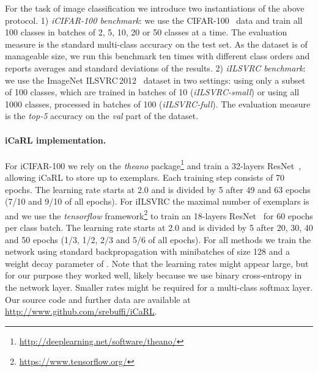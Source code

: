 \documentclass[10pt,twocolumn,letterpaper]{article}
\begin{document}
For the task of image classification we introduce two 
instantiations of the above protocol. 
1) \emph{iCIFAR-100 benchmark}: we use the CIFAR-100~\cite{krizhevsky2009learning} 
data and train all 100 classes in batches of 2, 5, 10, 20 or 50 classes 
at a time. The evaluation measure is the standard multi-class accuracy 
on the test set. 
As the dataset is of manageable size, we run this benchmark ten times 
with different class orders and reports averages and standard deviations 
of the results.
2) \emph{iILSVRC benchmark}: we use the ImageNet ILSVRC\,2012~\cite{ILSVRC15} 
dataset in two settings: using only a subset of 100 classes, which are trained 
in batches of 10 (\emph{iILSVRC-small}) or using all 1000 
classes, processed in batches of 100 (\emph{iILSVRC-full}). 
The evaluation measure is the \emph{top-5} accuracy on 
the \emph{val} part of the dataset. 



\paragraph{iCaRL implementation.}
For iCIFAR-100 we rely on the \emph{theano} package\footnote{\url{http://deeplearning.net/software/theano/}} and train a 
32-layers ResNet~\cite{He2015},
allowing iCaRL to store up to  exemplars. 
Each training step consists of 70 epochs. The learning rate starts 
at 2.0 and is divided by 5 after 49 and 63 epochs (7/10 and 9/10 of all epochs).
For iILSVRC the maximal number of exemplars is  and 
we use the \emph{tensorflow} framework\footnote{\url{https://www.tensorflow.org/}} 
to train an 18-layers ResNet~\cite{He2015} for 60 epochs per class batch.
The learning rate starts at 2.0 and is divided by 5 after 20, 30, 40 and 50 epochs
(1/3, 1/2, 2/3 and 5/6 of all epochs).
For all methods we train the network using standard backpropagation 
with minibatches of size 128 and a weight decay parameter of .
Note that the learning rates might appear large, but for our purpose 
they worked well, likely because we use binary cross-entropy in 
the network layer. 
Smaller rates might be required for a multi-class softmax layer. 
Our source code and further data are available at \url{http://www.github.com/srebuffi/iCaRL}.
\end{document}
